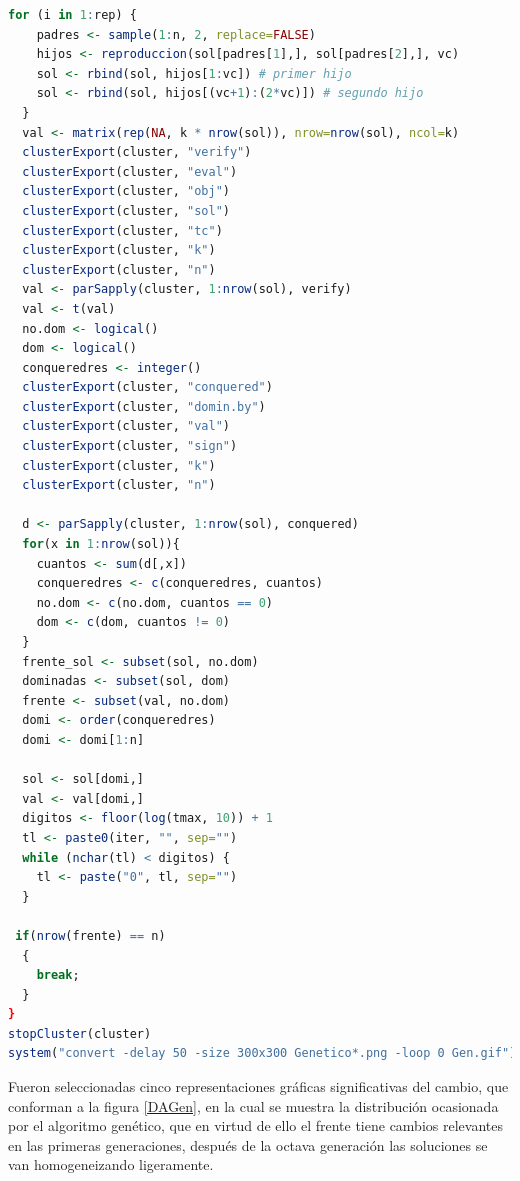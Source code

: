 \documentclass[12pt, letterpaper] {article}
\begin{document}
\begin{lstlisting}[language=R]
  for (i in 1:rep) { 
    padres <- sample(1:n, 2, replace=FALSE)
    hijos <- reproduccion(sol[padres[1],], sol[padres[2],], vc)
    sol <- rbind(sol, hijos[1:vc]) # primer hijo
    sol <- rbind(sol, hijos[(vc+1):(2*vc)]) # segundo hijo
  }
  val <- matrix(rep(NA, k * nrow(sol)), nrow=nrow(sol), ncol=k)
  clusterExport(cluster, "verify")
  clusterExport(cluster, "eval")
  clusterExport(cluster, "obj")
  clusterExport(cluster, "sol")
  clusterExport(cluster, "tc")
  clusterExport(cluster, "k")
  clusterExport(cluster, "n")
  val <- parSapply(cluster, 1:nrow(sol), verify)
  val <- t(val)
  no.dom <- logical()
  dom <- logical()
  conqueredres <- integer()
  clusterExport(cluster, "conquered")
  clusterExport(cluster, "domin.by")
  clusterExport(cluster, "val")
  clusterExport(cluster, "sign")
  clusterExport(cluster, "k")
  clusterExport(cluster, "n")
  
  d <- parSapply(cluster, 1:nrow(sol), conquered)
  for(x in 1:nrow(sol)){
    cuantos <- sum(d[,x])
    conqueredres <- c(conqueredres, cuantos)
    no.dom <- c(no.dom, cuantos == 0) 
    dom <- c(dom, cuantos != 0)
  }
  frente_sol <- subset(sol, no.dom) 
  dominadas <- subset(sol, dom)
  frente <- subset(val, no.dom) 
  domi <- order(conqueredres)
  domi <- domi[1:n]
  
  sol <- sol[domi,]
  val <- val[domi,]
  digitos <- floor(log(tmax, 10)) + 1
  tl <- paste0(iter, "", sep="")
  while (nchar(tl) < digitos) {
    tl <- paste("0", tl, sep="")
  }

 if(nrow(frente) == n)
  {
    break;
  }
}
stopCluster(cluster)
system("convert -delay 50 -size 300x300 Genetico*.png -loop 0 Gen.gif")
\end{lstlisting}

Fueron seleccionadas cinco representaciones gráficas significativas del cambio, que conforman a la figura \ref{DAGen}, en la cual se muestra la distribución ocasionada por el algoritmo genético, que en virtud de ello el frente tiene cambios relevantes en las primeras generaciones, después de la octava generación las soluciones se van homogeneizando ligeramente.
\end{document}
